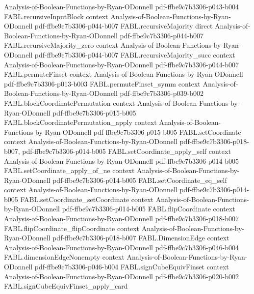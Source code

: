 \begin{theorem}
  {Analysis-of-Boolean-Functions-by-Ryan-ODonnell}
  {pdf-ffbe9c7b3306-p043-b004}
\proofstep
  {FABL.recursiveInputBlock}
  {context}
  {Analysis-of-Boolean-Functions-by-Ryan-ODonnell}
  {pdf-ffbe9c7b3306-p044-b007}
\proofstep
  {FABL.recursiveMajority}
  {direct}
  {Analysis-of-Boolean-Functions-by-Ryan-ODonnell}
  {pdf-ffbe9c7b3306-p044-b007}
\proofstep
  {FABL.recursiveMajority_zero}
  {context}
  {Analysis-of-Boolean-Functions-by-Ryan-ODonnell}
  {pdf-ffbe9c7b3306-p044-b007}
\proofstep
  {FABL.recursiveMajority_succ}
  {context}
  {Analysis-of-Boolean-Functions-by-Ryan-ODonnell}
  {pdf-ffbe9c7b3306-p044-b007}
\proofstep
  {FABL.permuteFinset}
  {context}
  {Analysis-of-Boolean-Functions-by-Ryan-ODonnell}
  {pdf-ffbe9c7b3306-p013-b003}
\proofstep
  {FABL.permuteFinset_symm}
  {context}
  {Analysis-of-Boolean-Functions-by-Ryan-ODonnell}
  {pdf-ffbe9c7b3306-p039-b002}
\proofstep
  {FABL.blockCoordinatePermutation}
  {context}
  {Analysis-of-Boolean-Functions-by-Ryan-ODonnell}
  {pdf-ffbe9c7b3306-p015-b005}
\proofstep
  {FABL.blockCoordinatePermutation_apply}
  {context}
  {Analysis-of-Boolean-Functions-by-Ryan-ODonnell}
  {pdf-ffbe9c7b3306-p015-b005}
\proofstep
  {FABL.setCoordinate}
  {context}
  {Analysis-of-Boolean-Functions-by-Ryan-ODonnell}
  {pdf-ffbe9c7b3306-p018-b007,
    pdf-ffbe9c7b3306-p014-b005}
\proofstep
  {FABL.setCoordinate_apply_self}
  {context}
  {Analysis-of-Boolean-Functions-by-Ryan-ODonnell}
  {pdf-ffbe9c7b3306-p014-b005}
\proofstep
  {FABL.setCoordinate_apply_of_ne}
  {context}
  {Analysis-of-Boolean-Functions-by-Ryan-ODonnell}
  {pdf-ffbe9c7b3306-p014-b005}
\proofstep
  {FABL.setCoordinate_eq_self}
  {context}
  {Analysis-of-Boolean-Functions-by-Ryan-ODonnell}
  {pdf-ffbe9c7b3306-p014-b005}
\proofstep
  {FABL.setCoordinate_setCoordinate}
  {context}
  {Analysis-of-Boolean-Functions-by-Ryan-ODonnell}
  {pdf-ffbe9c7b3306-p014-b005}
\proofstep
  {FABL.flipCoordinate}
  {context}
  {Analysis-of-Boolean-Functions-by-Ryan-ODonnell}
  {pdf-ffbe9c7b3306-p018-b007}
\proofstep
  {FABL.flipCoordinate_flipCoordinate}
  {context}
  {Analysis-of-Boolean-Functions-by-Ryan-ODonnell}
  {pdf-ffbe9c7b3306-p018-b007}
\proofstep
  {FABL.DimensionEdge}
  {context}
  {Analysis-of-Boolean-Functions-by-Ryan-ODonnell}
  {pdf-ffbe9c7b3306-p046-b004}
\proofstep
  {FABL.dimensionEdgeNonempty}
  {context}
  {Analysis-of-Boolean-Functions-by-Ryan-ODonnell}
  {pdf-ffbe9c7b3306-p046-b004}
\proofstep
  {FABL.signCubeEquivFinset}
  {context}
  {Analysis-of-Boolean-Functions-by-Ryan-ODonnell}
  {pdf-ffbe9c7b3306-p020-b002}
\proofstep
  {FABL.signCubeEquivFinset_apply_card}

\end{theorem}
